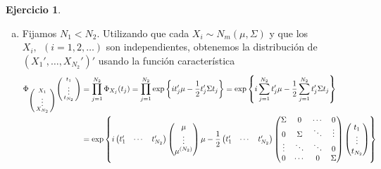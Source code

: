 \documentclass[12pt,spanish]{article}
\theoremstyle{definition}
\newtheorem{exercise}{Ejercicio}
\begin{document}
\begin{exercise} ~ %
  \begin{enumerate}[a)]
  \item Fijamos $N_1<N_2$. Utilizando que cada
    $X_i\sim N_m(\mu,\Sigma)$ y que los $X_i,\ \ (i=1,2,\ldots)$ son
    independientes, obtenemos la distribución de
    $(X_1',\ldots,X_{N_2}')'$ usando la función característica
  \begin{align*}\Phi_{
    \begin{psmallmatrix} X_1 \\ \vdots \\ X_{N_2}
    \end{psmallmatrix}}\begin{psmallmatrix} t_1 \\ \vdots \\ t_{N_2}
  \end{psmallmatrix}
    &=\prod_{j=1}^{N_2}\Phi_{X_j}(t_j)=\prod_{j=1}^{N_2}\exp\left\{it_j'\mu-\frac{1}{2}t_j'\Sigma
      t_j\right\}=\exp\left\{i\sum_{j=1}^{N_2}t_j'\mu-\frac{1}{2}\sum_{j=1}^{N_2}t_j'\Sigma t_j\right\} \\
    &=\exp\left\{i
      \begin{pmatrix}
        t_1' & \cdots & t_{N_2}'
      \end{pmatrix}
                        \begin{pmatrix}
                          \mu \\ \vdots \\ \mu^{(N_2)}
                        \end{pmatrix}
    \mu-\frac{1}{2}\begin{pmatrix}
      t_1' & \cdots & t_{N_2}'
    \end{pmatrix}
                      \begin{pmatrix}
                        \Sigma & 0 & \cdots & 0 \\
                        0 & \Sigma & \ddots & \vdots \\
                        \vdots & \ddots & \ddots & 0\\
                        0 & \cdots & 0 & \Sigma
                      \end{pmatrix}
                                         \begin{pmatrix}
                                           t_1 \\ \vdots \\ t_{N_2}
                                         \end{pmatrix}\right\}

\end{align*}
\end{enumerate}
\end{exercise}
\end{document}
